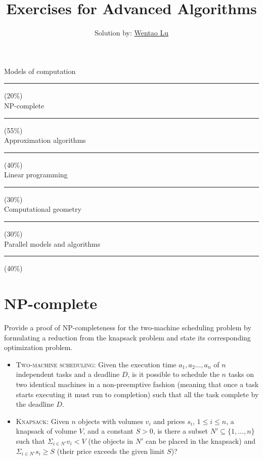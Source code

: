 \documentclass[11pt]{article}
\title{Exercises for Advanced Algorithms}
\author{Solution by: \href{mailto:neo-mashiro@hotmail.com}{Wentao Lu}}
\date{}
\begin{document}
  \newcommand{\solution}{\noindent \textbf{\textsc{Solution:}} \dotfill \vspace{2mm}}  %

  \maketitle

  \noindent \hspace{\fill} Models of computation \rule[0mm]{20mm}{2mm} (20\%)\\
  \hspace*{\fill} NP-complete \rule[0mm]{55mm}{2mm} (55\%)\\
  \hspace*{\fill} Approximation algorithms \rule[0mm]{40mm}{2mm} (40\%)\\
  \hspace*{\fill} Linear programming \rule[0mm]{30mm}{2mm} (30\%)\\
  \hspace*{\fill} Computational geometry \rule[0mm]{30mm}{2mm} (30\%)\\
  \hspace*{\fill} Parallel models and algorithms \rule[0mm]{40mm}{2mm} (40\%)

  \section{NP-complete}
    Provide a proof of NP-completeness for the two-machine scheduling problem by formulating a reduction from the knapsack problem and state its corresponding optimization problem.
    \begin{itemize}[leftmargin=*]
      \item \textsc{Two-machine scheduling:} Given the execution time $a_1, a_2 \dots, a_n$ of $n$ independent tasks and a deadline $D$, is it possible to schedule the $n$ tasks on two identical machines in a non-preemptive fashion (meaning that once a task starts executing it must run to completion) such that all the task complete by the deadline $D$.
      \item \textsc{Knapsack:} Given $n$ objects with volumes $v_i$ and prices $s_i$, \(1 \le i \le n\), a knapsack of volume $V$, and a constant $S > 0$, is there a subset $N' \subseteq \{1, \dots, n\}$ such that $\Sigma_{i \in N'} v_i < V$ (the objects in $N'$ can be placed in the knapsack) and $\Sigma_{i \in N'} s_i \geq S$ (their price exceeds the given limit $S$)?
    \end{itemize}
\end{document}
